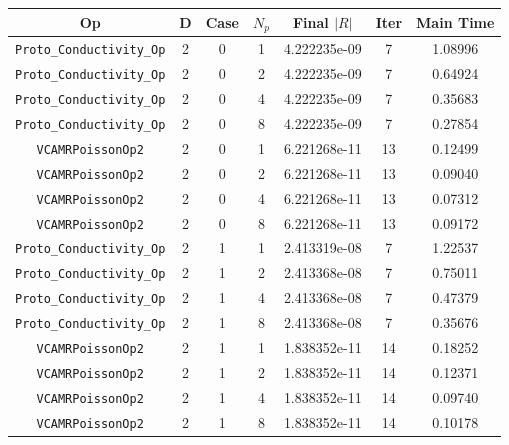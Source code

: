 \documentclass{article}
\begin{document}
\begin{small}
\begin{table}
\begin{center}
\begin{tabular}{|c|c|c|c|c|c||c|} \hline
 Op & D & Case & $N_p$ & Final $|R|$  &  Iter & Main Time \\
\hline
 {\tt Proto\_Conductivity\_Op}      & 2 & 0 & 1   & 4.222235e-09   & 7       & 1.08996    \\
 {\tt Proto\_Conductivity\_Op}      & 2 & 0 & 2   & 4.222235e-09   & 7       & 0.64924    \\
 {\tt Proto\_Conductivity\_Op}      & 2 & 0 & 4   & 4.222235e-09   & 7       & 0.35683    \\
 {\tt Proto\_Conductivity\_Op}      & 2 & 0 & 8   & 4.222235e-09   & 7       & 0.27854    \\
\hline                                                                        
 {\tt VCAMRPoissonOp2}              & 2 & 0 & 1   & 6.221268e-11   & 13      & 0.12499    \\
 {\tt VCAMRPoissonOp2}              & 2 & 0 & 2   & 6.221268e-11   & 13      & 0.09040    \\
 {\tt VCAMRPoissonOp2}              & 2 & 0 & 4   & 6.221268e-11   & 13      & 0.07312    \\
 {\tt VCAMRPoissonOp2}              & 2 & 0 & 8   & 6.221268e-11   & 13      & 0.09172    \\
\hline
 {\tt Proto\_Conductivity\_Op}      & 2 & 1 & 1   & 2.413319e-08   &  7      & 1.22537    \\
 {\tt Proto\_Conductivity\_Op}      & 2 & 1 & 2   & 2.413368e-08   &  7      & 0.75011    \\
 {\tt Proto\_Conductivity\_Op}      & 2 & 1 & 4   & 2.413368e-08   &  7      & 0.47379    \\
 {\tt Proto\_Conductivity\_Op}      & 2 & 1 & 8   & 2.413368e-08   &  7      & 0.35676    \\
\hline                                                                         
 {\tt VCAMRPoissonOp2}              & 2 & 1 & 1   & 1.838352e-11   &  14     & 0.18252    \\
 {\tt VCAMRPoissonOp2}              & 2 & 1 & 2   & 1.838352e-11   &  14     & 0.12371    \\
 {\tt VCAMRPoissonOp2}              & 2 & 1 & 4   & 1.838352e-11   &  14     & 0.09740    \\
 {\tt VCAMRPoissonOp2}              & 2 & 1 & 8   & 1.838352e-11   &  14     & 0.10178    \\

\end{tabular}
\end{center}
\end{table}
\end{small}
\end{document}
